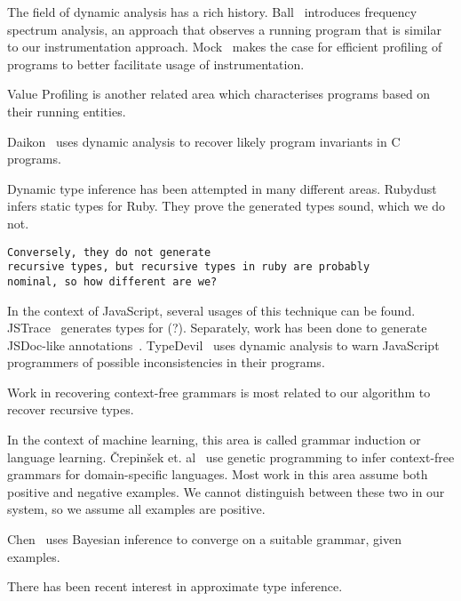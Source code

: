 
The field of dynamic analysis has a rich history.
Ball~\cite{ball1999concept}
introduces frequency spectrum analysis,
an approach that observes a running program
that is similar to our instrumentation approach.
Mock~\cite{mock2003dynamic}
makes the case for efficient profiling of programs
to better facilitate usage of instrumentation.

Value Profiling is another related area which characterises
programs based on their running entities.

Daikon~\cite{ernst2001dynamically}
uses dynamic analysis to recover likely program invariants
in C programs.

Dynamic type inference has been attempted in many different
areas.
Rubydust~\cite{An10dynamicinference}
infers static types for Ruby. They prove the generated types
sound, which we do not. 
\begin{verbatim}
Conversely, they do not generate
recursive types, but recursive types in ruby are probably
nominal, so how different are we?
\end{verbatim}

In the context of JavaScript, several usages of this technique
can be found.
JSTrace~\cite{saftoiu2010jstrace}
generates types for (?).
Separately, work has been done to generate JSDoc-like annotations~\cite{odgaard2014}.
TypeDevil~\cite{pradel2015typedevil}
uses dynamic analysis to warn JavaScript programmers of possible inconsistencies
in their programs.

Work in recovering context-free grammars is most related to our algorithm
to recover recursive types.

In the context of machine learning, 
this area is called grammar induction or language learning.  %
{\v{C}}repin{\v{s}}ek et. al~\cite{vcrepinvsek2005inferring}
use genetic programming to infer context-free grammars
for domain-specific languages.
Most work in this area assume both positive and negative
examples. We cannot distinguish between these two in
our system, so we assume all examples are positive.

Chen~\cite{chen1995bayesian} uses Bayesian inference to converge
on a suitable grammar, given examples.

There has been recent interest in approximate type inference.

